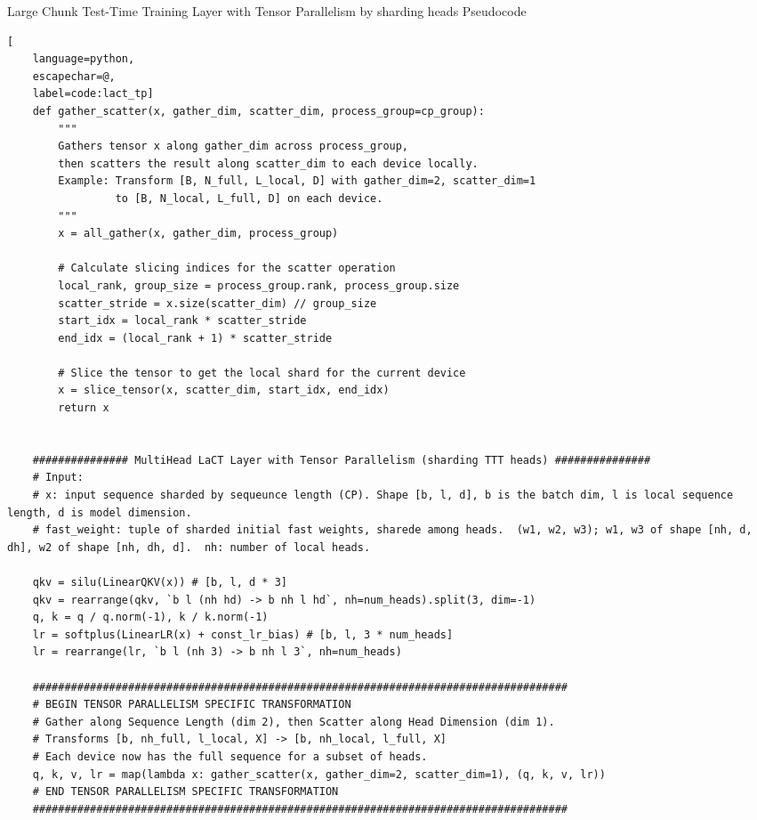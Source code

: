 \documentclass{article}
\begin{document}
\begin{algorithm}[h]
\caption{Large Chunk Test-Time Training Layer with Tensor Parallelism by sharding heads Pseudocode}\label{alg:lact_tp}
\newcommand{\hlbox}[1]{
  \fboxsep=1.2pt\hspace*{-\fboxsep}\colorbox{blue!10}{\detokenize{#1}}
}
\lstset{style=mocov3}
\begin{lstlisting}[
    language=python,
    escapechar=@,
    label=code:lact_tp]
    def gather_scatter(x, gather_dim, scatter_dim, process_group=cp_group):
        """
        Gathers tensor x along gather_dim across process_group,
        then scatters the result along scatter_dim to each device locally.
        Example: Transform [B, N_full, L_local, D] with gather_dim=2, scatter_dim=1
                 to [B, N_local, L_full, D] on each device.
        """
        x = all_gather(x, gather_dim, process_group)

        # Calculate slicing indices for the scatter operation
        local_rank, group_size = process_group.rank, process_group.size
        scatter_stride = x.size(scatter_dim) // group_size
        start_idx = local_rank * scatter_stride
        end_idx = (local_rank + 1) * scatter_stride

        # Slice the tensor to get the local shard for the current device
        x = slice_tensor(x, scatter_dim, start_idx, end_idx)
        return x

        
    ############### MultiHead LaCT Layer with Tensor Parallelism (sharding TTT heads) ###############
    # Input: 
    # x: input sequence sharded by sequeunce length (CP). Shape [b, l, d], b is the batch dim, l is local sequence length, d is model dimension. 
    # fast_weight: tuple of sharded initial fast weights, sharede among heads.  (w1, w2, w3); w1, w3 of shape [nh, d, dh], w2 of shape [nh, dh, d].  nh: number of local heads. 

    qkv = silu(LinearQKV(x)) # [b, l, d * 3]
    qkv = rearrange(qkv, `b l (nh hd) -> b nh l hd`, nh=num_heads).split(3, dim=-1)
    q, k = q / q.norm(-1), k / k.norm(-1)
    lr = softplus(LinearLR(x) + const_lr_bias) # [b, l, 3 * num_heads]
    lr = rearrange(lr, `b l (nh 3) -> b nh l 3`, nh=num_heads)

    ####################################################################################
    # BEGIN TENSOR PARALLELISM SPECIFIC TRANSFORMATION 
    # Gather along Sequence Length (dim 2), then Scatter along Head Dimension (dim 1).
    # Transforms [b, nh_full, l_local, X] -> [b, nh_local, l_full, X]
    # Each device now has the full sequence for a subset of heads.
    q, k, v, lr = map(lambda x: gather_scatter(x, gather_dim=2, scatter_dim=1), (q, k, v, lr))
    # END TENSOR PARALLELISM SPECIFIC TRANSFORMATION
    ####################################################################################


\end{lstlisting}
\end{algorithm}
\end{document}
